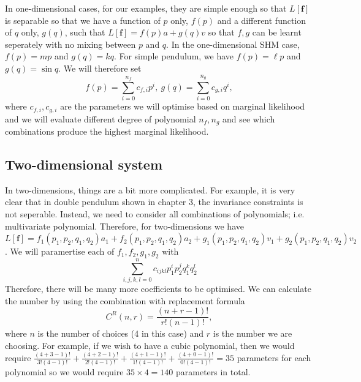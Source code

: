 \documentclass{statsmsc}
\begin{document}
In one-dimensional cases, for our examples, they are simple enough so that $L[\mathbf{f}]$ is separable so that we have a function of $p$ only, $f(p)$ and a different function of $q$ only, $g(q)$, such that $L[\mathbf{f}]=f(p)a+g(q)v$ so that $f, g$ can be learnt seperately with no mixing between $p$ and $q$.
In the one-dimensional SHM case, $f(p)=mp$ and $g(q)=kq$.
For simple pendulum, we have $f(p)=\ell p$ and $g(q)=\sin q$.
We will therefore set $$f(p)=\sum_{i=0}^{n_f}c_{f,i}p^i,\ g(q)=\sum_{i=0}^{n_g}c_{g,i}q^i,$$
where $c_{f,i}, c_{g,i}$ are the parameters we will optimise based on marginal likelihood and we will evaluate different degree of polynomial $n_f, n_g$ and see which combinations produce the highest marginal likelihood. 

\subsection{Two-dimensional system}
In two-dimensions, things are a bit more complicated. 
For example, it is very clear that in double pendulum shown in chapter 3, the invariance constraints is not seperable.
Instead, we need to consider all combinations of polynomials; i.e. multivariate polynomial.
Therefore, for two-dimensions we have $L[\mathbf{f}]=f_1(p_1, p_2, q_1, q_2)a_1+f_2(p_1, p_2, q_1, q_2)a_2+g_1(p_1, p_2, q_1, q_2)v_1+g_2(p_1, p_2, q_1, q_2)v_2$.
We will paramertise each of $f_1, f_2, g_1, g_2$ with $$\sum_{i,j,k,l=0}^{n}c_{ijkl}p_1^ip_2^jq_1^kq_2^l$$
Therefore, there will be many more coefficients to be optimised.
We can calculate the number by using the combination with replacement formula
$$
C^R(n, r) = \frac{(n+r-1)!}{r!(n-1)!},
$$
where $n$ is the number of choices (4 in this case) and $r$ is the number we are choosing.
For example, if we wish to have a cubic polynomial, then we would require $\frac{(4+3-1)!}{3!(4-1)!}+\frac{(4+2-1)!}{2!(4-1)!}+\frac{(4+1-1)!}{1!(4-1)!}+\frac{(4+0-1)!}{0!(4-1)!}=35$ parameters for each polynomial so we would require $35\times 4=140$ parameters in total.
\end{document}
